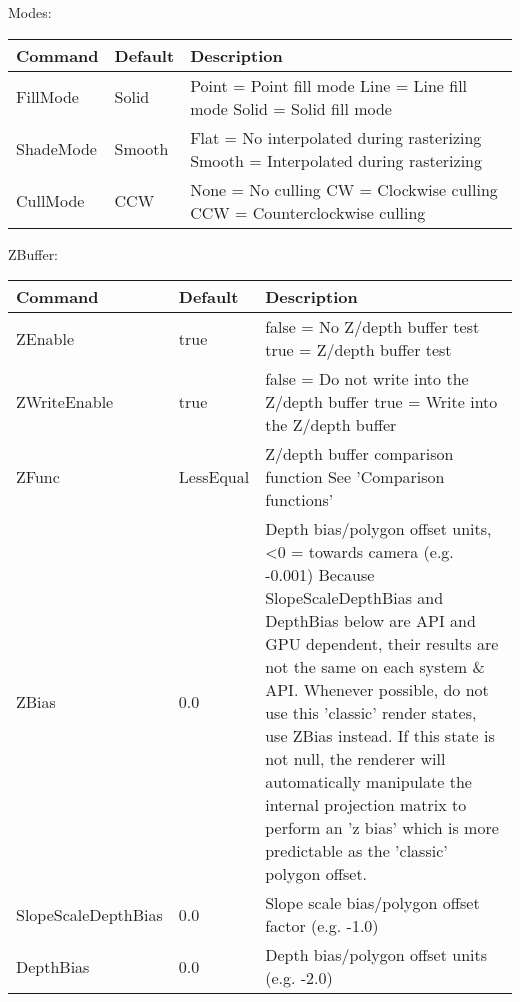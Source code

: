 Modes:\\
\begin{tabular}{|p{4.5cm}|p{3cm}|p{9cm}|}
\hline
\textbf{Command} & \textbf{Default} & \textbf{Description}\\
\hline
FillMode  & Solid  & Point = Point fill mode\newline
                     Line  = Line fill mode\newline
                     Solid = Solid fill mode\\
\hline
ShadeMode & Smooth & Flat   = No interpolated during rasterizing\newline
                     Smooth = Interpolated during rasterizing\\
\hline
CullMode  & CCW    & None = No culling\newline
                     CW	  = Clockwise culling\newline
                     CCW  = Counterclockwise culling\\
\hline
\end{tabular}


ZBuffer:\\
\begin{tabular}{|p{4.5cm}|p{3cm}|p{9cm}|}
\hline
\textbf{Command} & \textbf{Default} & \textbf{Description}\\
\hline
ZEnable              & true      & false = No Z/depth buffer test\newline
                                   true  = Z/depth buffer test\\
\hline
ZWriteEnable         & true      & false = Do not write into the Z/depth buffer\newline
                                   true  = Write into the Z/depth buffer\\
\hline
ZFunc                & LessEqual & Z/depth buffer comparison function\newline
                                   See 'Comparison functions'\\
\hline
ZBias                & 0.0       & Depth bias/polygon offset units, <0 = towards camera (e.g. -0.001)\newline
                                   Because SlopeScaleDepthBias and DepthBias below are \ac{API} and 
                                   \ac{GPU} dependent, their results are not the same on each system \& \ac{API}. Whenever possible, do not use 
                                   this 'classic' render states, use ZBias instead. If this state is not null, the renderer 
                                   will automatically manipulate the internal projection matrix to perform an 'z bias' which is more 
                                   predictable as the 'classic' polygon offset.\\
\hline
SlopeScaleDepthBias  & 0.0       & Slope scale bias/polygon offset factor (e.g. -1.0)\\
\hline
DepthBias            & 0.0       & Depth bias/polygon offset units (e.g. -2.0)\\
\hline
\end{tabular}

